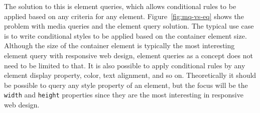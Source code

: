 \documentclass[a4paper,11pt]{kth-mag}
\newcommand{\code}[1]{\texttt{#1}}
\begin{document}
      The solution to this is element queries, which allows conditional rules to be applied based on any criteria for any \gls{element}.
      Figure~\ref{fig:mq-vs-eq} shows the problem with \gls{media queries} and the element query solution.
      The typical use case is to write conditional styles to be applied based on the container \gls{element} size.
      Although the size of the container \gls{element} is typically the most interesting element query with \gls{responsive} \gls{web} design, element queries as a concept does not need to be limited to that.
      It is also possible to apply conditional rules by any \gls{element} display property, color, text alignment, and so on.
      Theoretically it should be possible to query any style property of an \gls{element}, but the focus will be the \code{width} and \code{height} properties since they are the most interesting in \gls{responsive} \gls{web} design.
\end{document}
